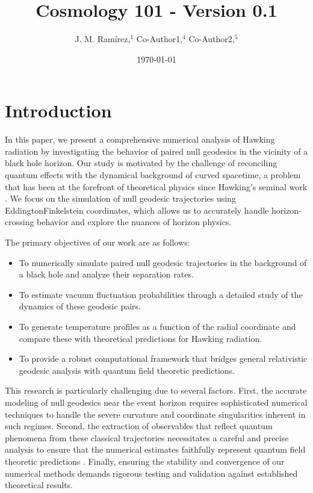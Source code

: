 \documentclass{article}\usepackage{graphicx} \usepackage{amsmath} \usepackage{colortbl}\title{Cosmology 101 - Version 0.1}
\author{J. M. Ram{\'i}rez,$^{1}$ Co-Author1,$^{4}$ Co-Author2,$^{5}$}
\date{\today}
\begin{document}
\maketitle\section{Introduction}
In this paper, we present a comprehensive numerical analysis of Hawking radiation by investigating the behavior of paired null geodesics in the vicinity of a black hole horizon. Our study is motivated by the challenge of reconciling quantum effects with the dynamical background of curved spacetime, a problem that has been at the forefront of theoretical physics since Hawking's seminal work \cite{Hawking1975}. We focus on the simulation of null geodesic trajectories using Eddington\textendash Finkelstein coordinates, which allows us to accurately handle horizon-crossing behavior and explore the nuances of horizon physics.

The primary objectives of our work are as follows:
\begin{itemize}
    \item To numerically simulate paired null geodesic trajectories in the background of a black hole and analyze their separation rates.
    \item To estimate vacuum fluctuation probabilities through a detailed study of the dynamics of these geodesic pairs.
    \item To generate temperature profiles as a function of the radial coordinate and compare these with theoretical predictions for Hawking radiation.
    \item To provide a robust computational framework that bridges general relativistic geodesic analysis with quantum field theoretic predictions.
\end{itemize}

This research is particularly challenging due to several factors. First, the accurate modeling of null geodesics near the event horizon requires sophisticated numerical techniques to handle the severe curvature and coordinate singularities inherent in such regimes. Second, the extraction of observables that reflect quantum phenomena from these classical trajectories necessitates a careful and precise analysis to ensure that the numerical estimates faithfully represent quantum field theoretic predictions \cite{Jacobson1993}. Finally, ensuring the stability and convergence of our numerical methods demands rigorous testing and validation against established theoretical results.
\end{document}
